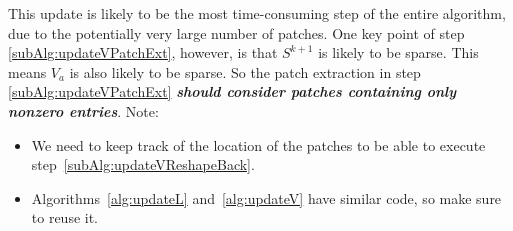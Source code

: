 \documentclass[a4paper,11pt]{article}
\begin{document}
This update is likely to be the most time-consuming step of the entire
algorithm, due to the potentially very large number of patches. One key point
of step \ref{subAlg:updateVPatchExt},
however, is that $S^{k+1}$ is likely to be sparse. This means $V_a$ is also
likely to be sparse. So the patch extraction in step
\ref{subAlg:updateVPatchExt} \textbf{\textit{should consider patches containing only nonzero
entries}}. Note:
\begin{itemize}
  \item We need to keep track of the location of the patches to be able to
    execute step~\ref{subAlg:updateVReshapeBack}.

  \item Algorithms~\ref{alg:updateL} and~\ref{alg:updateV} have similar code,
    so make sure to reuse it.
\end{itemize}
\end{document}
